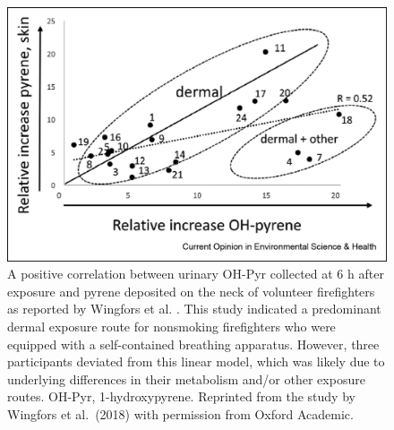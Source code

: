 \documentclass[preprint, 3p,
authoryear]{elsarticle} %
\begin{document}
\begin{figure}
\centering
\includegraphics{./Figures/Figure2.jpg}
\caption{A positive correlation between urinary OH-Pyr collected at 6 h
after exposure and pyrene deposited on the neck of volunteer
firefighters as reported by Wingfors et al. \citep{12}. This study
indicated a predominant dermal exposure route for nonsmoking
firefighters who were equipped with a self-contained breathing
apparatus. However, three participants deviated from this linear model,
which was likely due to underlying differences in their metabolism
and/or other exposure routes. OH-Pyr, 1-hydroxypyrene. Reprinted from
the study by Wingfors et al.~(2018) with permission from Oxford
Academic.}
\end{figure}
\end{document}
